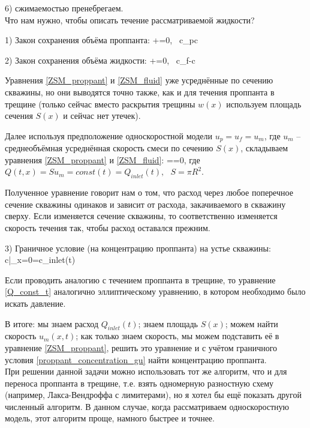 \documentclass[main.tex]{subfiles}
\begin{document}
6) сжимаемостью пренебрегаем.
\\

Что нам нужно, чтобы описать течение рассматриваемой жидкости?

1) Закон сохранения объёма проппанта:
\beq\label{ZSM_proppant}
+=0,\,\,\,\,\,c_p\equiv c
\eeq

2) Закон сохранения объёма жидкости:
\beq\label{ZSM_fluid}
+=0,\,\,\,\,\,c_f-c
\eeq

Уравнения \eqref{ZSM_proppant} и \eqref{ZSM_fluid} уже усреднённые по сечению скважины, но они выводятся точно также, как и для течения проппанта в трещине (только сейчас вместо раскрытия трещины $w(x)$ используем площадь сечения $S(x)$ и сейчас нет утечек).

Далее используя предположение односкоростной модели $u_p=u_f=u_m$, где $u_m$ -- среднеобъёмная усреднённая скорость смеси по сечению $S(x)$, складываем уравнения \eqref{ZSM_proppant} и \eqref{ZSM_fluid}:
\beq\label{Q_const_t}
==0,
\eeq
где $Q(t,x)=Su_m=const(t)=Q_{inlet}(t),\,\,\,\,S=\pi R^2$.

Полученное уравнение говорит нам о том, что расход через любое поперечное сечение скважины одинаков и зависит от расхода, закачиваемого в скважину сверху.
Если изменяется сечение скважины, то соответственно изменяется скорость течения так, чтобы расход оставался прежним.

3) Граничное условие (на концентрацию проппанта) на устье скважины:
\beq\label{proppant_concentration_gu}
c|_{x=0}=c_{inlet}(t)
\eeq

Если проводить аналогию с течением проппанта в трещине, то уравнение \eqref{Q_const_t} аналогично эллиптическому уравнению, в котором необходимо было искать давление.

В итоге: мы знаем расход $Q_{inlet}(t)$; знаем площадь $S(x)$; можем найти скорость $u_m(x,t)$; как только знаем скорость, мы можем подставить её в уравнение \eqref{ZSM_proppant}, решить это уравнение и с учётом граничного условия \eqref{proppant_concentration_gu} найти концентрацию проппанта.
\\

При решении данной задачи можно использовать тот же алгоритм, что и для переноса проппанта в трещине, т.е. взять одномерную разностную схему (например, Лакса-Вендроффа с лимитерами), но я хотел бы ещё показать другой численный алгоритм.
В данном случае, когда рассматриваем односкоростную модель, этот алгоритм проще, намного быстрее и точнее.
\\
\end{document}
